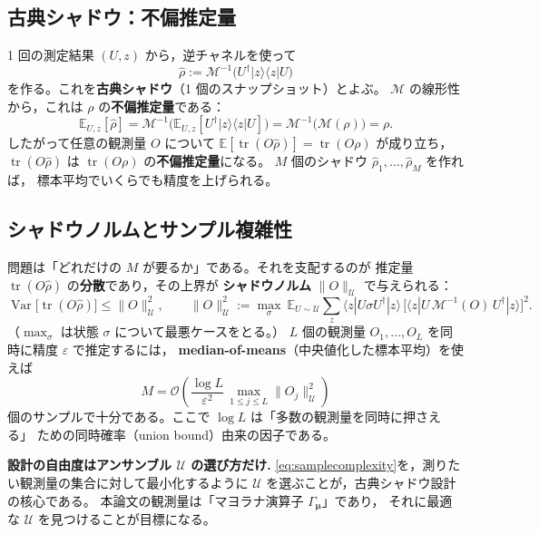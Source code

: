 \documentclass[11pt,a4paper]{ltjsarticle}
\newcommand{\bra}[1]{\langle #1|}
\newcommand{\ket}[1]{|#1\rangle}
\newcommand{\ketbra}[2]{|#1\rangle\!\langle #2|}
\newcommand{\tr}{\operatorname{tr}}
\newcommand{\Var}{\operatorname{Var}}
\newcommand{\E}{\mathbb{E}}
\newcommand{\Uc}{\mathcal{U}}
\newcommand{\Mc}{\mathcal{M}}
\theoremstyle{definition}
\theoremstyle{plain}
\begin{document}
\subsection{古典シャドウ：不偏推定量}
1 回の測定結果 $(U,z)$ から，逆チャネルを使って
\begin{equation}
  \hat\rho:=\Mc^{-1}\bigl(U^\dagger\ketbra{z}{z}U\bigr)
  \label{eq:shadow}
\end{equation}
を作る。これを\textbf{古典シャドウ}（1 個のスナップショット）とよぶ。
$\Mc$ の線形性から，これは $\rho$ の\textbf{不偏推定量}である：
\begin{equation}
  \E_{U,z}[\hat\rho]
   =\Mc^{-1}\bigl(\E_{U,z}[U^\dagger\ketbra{z}{z}U]\bigr)
   =\Mc^{-1}\bigl(\Mc(\rho)\bigr)=\rho .
\end{equation}
したがって任意の観測量 $O$ について
$\E[\tr(O\hat\rho)]=\tr(O\rho)$ が成り立ち，
$\tr(O\hat\rho)$ は $\tr(O\rho)$ の\textbf{不偏推定量}になる。
$M$ 個のシャドウ $\hat\rho_1,\dots,\hat\rho_M$ を作れば，
標本平均でいくらでも精度を上げられる。

\subsection{シャドウノルムとサンプル複雑性}
問題は「どれだけの $M$ が要るか」である。それを支配するのが
推定量 $\tr(O\hat\rho)$ の\textbf{分散}であり，その上界が
\textbf{シャドウノルム} $\|O\|_{\Uc}$ で与えられる：
\begin{equation}
  \Var\bigl[\tr(O\hat\rho)\bigr]\le \|O\|_{\Uc}^2,\qquad
  \|O\|_{\Uc}^2
  :=\max_{\sigma}\ \E_{U\sim\Uc}\sum_z
     \bra z U\sigma U^\dagger\ket z\,
     \bigl[\bra z U\,\Mc^{-1}(O)\,U^\dagger\ket z\bigr]^2 .
  \label{eq:shadownorm}
\end{equation}
（$\max_\sigma$ は状態 $\sigma$ について最悪ケースをとる。）
$L$ 個の観測量 $O_1,\dots,O_L$ を同時に精度 $\varepsilon$ で推定するには，
\textbf{median-of-means}（中央値化した標本平均）を使えば
\begin{equation}
  M=\mathcal{O}\!\left(\frac{\log L}{\varepsilon^2}\,
     \max_{1\le j\le L}\|O_j\|_{\Uc}^2\right)
  \label{eq:samplecomplexity}
\end{equation}
個のサンプルで十分である。ここで $\log L$ は「多数の観測量を同時に押さえる」
ための同時確率（union bound）由来の因子である。

\begin{keybox}
\textbf{設計の自由度はアンサンブル $\Uc$ の選び方だけ.}\;
\eqref{eq:samplecomplexity}を，測りたい観測量の集合に対して最小化するように
$\Uc$ を選ぶことが，古典シャドウ設計の核心である。
本論文の観測量は「マヨラナ演算子 $\Gamma_{\bm\mu}$」であり，
それに最適な $\Uc$ を見つけることが目標になる。
\end{keybox}
\end{document}
